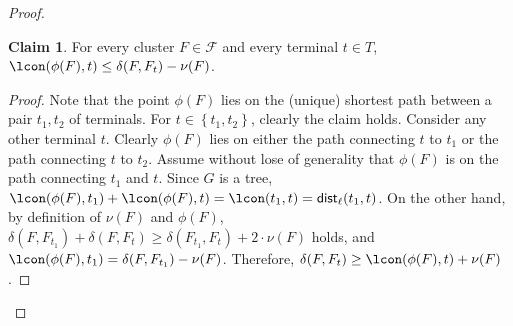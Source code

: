 \documentclass[11pt]{article}
\theoremstyle{definition}
\newtheorem{claim}[theorem]{Claim}
\newcommand{\set}[1]{\left\{ #1 \right\}}
\newcommand{\fset}{{\mathcal{F}}}
\newcommand{\dist}{\textnormal{\textsf{dist}}}
\begin{document}
\begin{titlepage}
\begin{proof}

 

\begin{claim} \label{clm:t-proj}
For every cluster $F\in \fset$ and every terminal $t\in T$, $\lcon(\phi(F),t) \le \delta(F,F_t) - \nu(F)$. 
\end{claim}

\begin{proof}
Note that the point $\phi(F)$ lies on the (unique) shortest path between a pair $t_1,t_2$ of terminals.
For $t\in \set{t_1,t_2}$, clearly the claim holds.
Consider any other terminal $t$. Clearly $\phi(F)$ lies on either the path connecting $t$ to $t_1$ or the path connecting $t$ to $t_2$. 
Assume without lose of generality that $\phi(F)$ is on the path connecting $t_1$ and $t$.
Since $G$ is a tree, $\lcon(\phi(F),t_1)+\lcon(\phi(F),t) = \lcon(t_1,t) = \dist_{\ell}(t_1,t)$. On the other hand, by definition of $\nu(F)$ and $\phi(F)$, $\delta(F,F_{t_1})+\delta(F,F_t) \ge \delta(F_{t_1},F_{t}) + 2 \cdot\nu(F)$ holds, and $\lcon(\phi(F),t_1) = \delta(F,F_{t_1}) - \nu(F)$. Therefore, $\delta(F,F_t) \ge \lcon(\phi(F),t) + \nu(F)$.
\end{proof}
    

\end{proof}
\end{titlepage}
\end{document}
